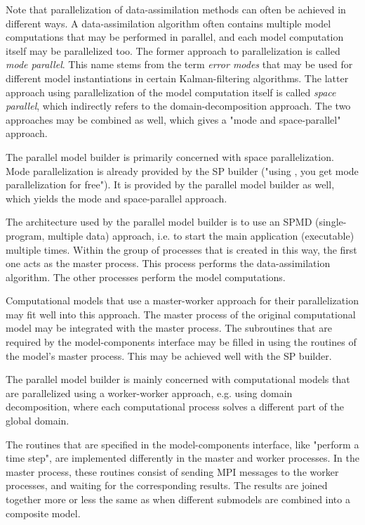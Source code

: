 Note that parallelization of data-assimilation methods can often be achieved in different ways. A data-assimilation algorithm often contains multiple model computations that may be performed in parallel, and each model computation itself may be parallelized too. The former approach to parallelization is called \emph{mode parallel}. This name stems from the term \emph{error modes} that may be used for different model instantiations in certain Kalman-filtering algorithms. The latter approach using parallelization of the model computation itself is called \emph{space parallel}, which indirectly refers to the domain-decomposition approach. The two approaches may be combined as well, which gives a "mode and space-parallel" approach.

The parallel model builder is primarily concerned with space parallelization. Mode par\-al\-lelization is already provided by the SP builder ("using \oda, you get mode parallelization for free"). It is provided by the parallel model builder as well, which yields the mode and space-parallel approach.

The architecture used by the parallel model builder is to use an SPMD (single-program, multiple data) approach, i.e. to start the main \oda application (executable) multiple times. Within the group of processes that is created in this way, the first one acts as the master process. This process performs the data-assimilation algorithm. The other processes perform the model computations.

Computational models that use a master-worker approach for their parallelization may fit well into this approach. The master process of the original computational model may be integrated with the \oda master process. The subroutines that are required by the \oda model-components interface may be filled in using the routines of the model's master process. This may be achieved well with the SP builder.

The parallel model builder is mainly concerned with computational models that are parallelized using a worker-worker approach, e.g. using domain decomposition, where each computational process solves a different part of the global domain.

The routines that are specified in the \oda model-components interface, like "perform a time step", are implemented differently in the master and worker processes. In the master process, these routines consist of sending MPI messages to the worker processes, and waiting for the corresponding results. The results are joined together more or less the same as when different submodels are combined into a composite model.

